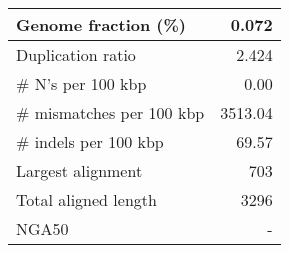 \documentclass[12pt,a4paper]{article}
\begin{document}
\begin{table}[ht]
\begin{center}
\begin{tabular}{|l*{1}{|r}|}
Genome fraction (\%) & 0.072 \\ \hline
Duplication ratio & 2.424 \\ \hline
\# N's per 100 kbp & 0.00 \\ \hline
\# mismatches per 100 kbp & 3513.04 \\ \hline
\# indels per 100 kbp & 69.57 \\ \hline
Largest alignment & 703 \\ \hline
Total aligned length & 3296 \\ \hline
NGA50 & - \\ \hline
\end{tabular}
\end{center}
\end{table}
\end{document}
